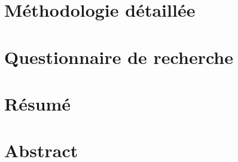 \documentclass{Classe_Seba}
\begin{document}
        \begin{appendices}
        \renewcommand{\cftchappresnum}{Annexe }
        \renewcommand{\appendixpagename}{Annexes}
        \renewcommand{\appendixname}{Annexe}
        \renewcommand{\appendixtocname}{\Large \textsc Annexes}
        \addappheadtotoc
        \appendixpage

          \chapter{Méthodologie détaillée}
            \label{annexemethodo}
            
          \chapter{Questionnaire de recherche}
            
        \end{appendices}


\backmatter
    		\chapter*{Résumé}
    		
    		

             
    		\chapter*{Abstract}
    		
    		

    		\newpage
    		\tableofcontents
\end{document}
